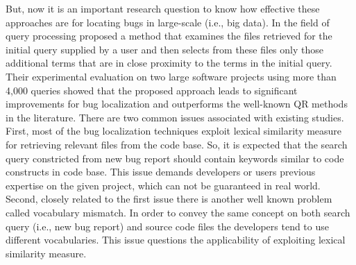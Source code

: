 \documentclass{sig-alternate}
\begin{document}
But, now it is an important research question to know how effective these approaches are for locating bugs in large-scale (i.e., big data).
 In the field of query processing
\citet{Sisman}  proposed a method that examines the files retrieved for the initial query supplied by a user and then selects from these files only those additional terms that are in close proximity to the terms in the initial query. Their \cite{Sisman} experimental evaluation on two large software projects using more than 4,000 queries showed that the proposed approach leads to significant improvements for bug localization and outperforms the well-known QR methods
in the literature.
There are two common issues associated with existing studies. First, 
most of the bug localization techniques exploit lexical similarity measure for retrieving relevant files from the code base. So, it is expected that the search query constricted from new bug report should contain keywords similar to code constructs in code base. This issue demands developers or users  previous expertise on the given project, which can not be guaranteed in real world. 
Second, closely related to the first issue there is another well known problem called vocabulary mismatch. In order to convey the same concept on both search query (i.e., new bug report) and source code files the developers tend to use different vocabularies. This issue questions the applicability of exploiting lexical similarity measure.
\end{document}
